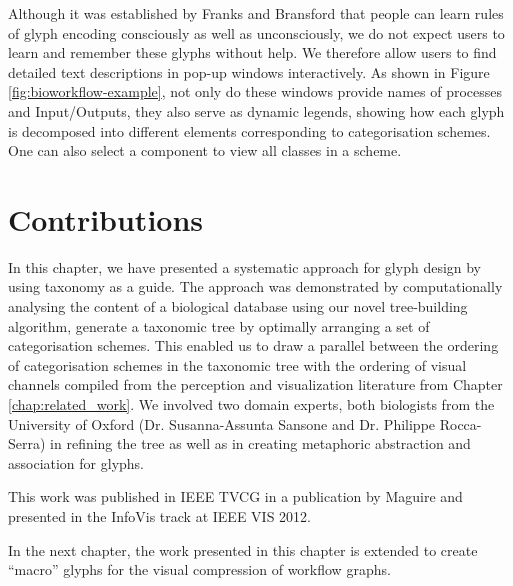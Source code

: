 Although it was established by Franks and Bransford \cite{franks71} that people can learn rules of glyph encoding consciously as well as unconsciously, we do not expect users to learn and remember these glyphs without help. 
We therefore allow users to find detailed text descriptions in pop-up windows interactively. 
As shown in Figure \ref{fig:bioworkflow-example}, not only do these windows provide names of processes and Input/Outputs, they also serve as dynamic legends, showing how each glyph is decomposed into different elements corresponding to categorisation schemes. 
One can also select a component to view all classes in a scheme.   

\section{Contributions}
\label{sec:glyph_tax_contributions}

In this chapter, we have presented a systematic approach for glyph design by using taxonomy as a guide. 
The approach was demonstrated by computationally analysing the content of a biological database using our novel tree-building algorithm, generate a taxonomic tree by optimally arranging a set of categorisation schemes.
This enabled us to draw a parallel between the ordering of categorisation schemes in the taxonomic tree with the ordering of visual channels compiled from the perception and visualization literature from Chapter \ref{chap:related_work}.
We involved two domain experts, both biologists from the University of Oxford (Dr. Susanna-Assunta Sansone and Dr. Philippe Rocca-Serra) in refining the tree as well as in creating metaphoric abstraction and association for glyphs.

This work was published in IEEE TVCG in a publication by Maguire \etal \cite{Maguire:2012:TVCG} and presented in the InfoVis track at IEEE VIS 2012.

In the next chapter, the work presented in this chapter is extended to create ``macro'' glyphs for the visual compression of workflow graphs.
